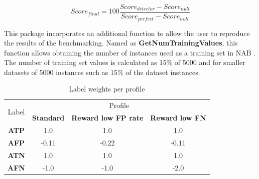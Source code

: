 \documentclass[a4paper]{article}
\begin{document}
\begin{equation}\label{eq:eq1}
Score_{final} = 100 \frac{Score_{detector} - Score_{null}}{Score_{perfect} - Score_{null}}
\end{equation}

This package incorporates an additional function to allow the user to reproduce the results of the benchmarking. Named as \textbf{GetNumTrainingValues}, this function allows obtaining the number of instances used as a training set in NAB \cite{7424283}. The number of training set values is calculated as 15\% of 5000 and for smaller datasets of 5000 instances such as 15\% of the dataset instances.


\begin{table}[]
\caption{Label weights per profile}
\label{tab:profile}
\centering
\begin{tabular}{cccc}
\hline
\multirow{2}{*}{Label} & \multicolumn{3}{c}{Profile} \\ \cline{2-4}
 & \textbf{Standard} & \textbf{Reward low FP rate} & \textbf{Reward low FN} \\ \hline
\textbf{ATP} & 1.0 & 1.0 & 1.0 \\ \hline
\textbf{AFP} & -0.11 & -0.22 & -0.11 \\ \hline
\textbf{ATN} & 1.0 & 1.0 & 1.0 \\ \hline
\textbf{AFN} & -1.0 & -1.0 & -2.0 \\ \hline
\end{tabular}
\end{table}
\end{document}
